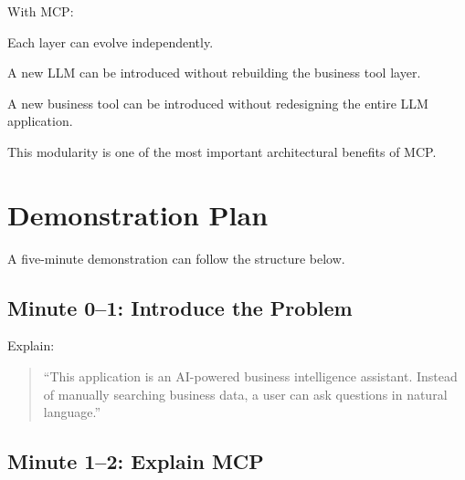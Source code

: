 \documentclass[11pt,a4paper]{article}
\begin{document}
With MCP:

\begin{center}


\end{center}

Each layer can evolve independently.

A new LLM can be introduced without rebuilding the business tool layer.

A new business tool can be introduced without redesigning the entire
LLM application.

This modularity is one of the most important architectural benefits
of MCP.

\section{Demonstration Plan}

A five-minute demonstration can follow the structure below.

\subsection{Minute 0--1: Introduce the Problem}

Explain:

\begin{quote}
``This application is an AI-powered business intelligence assistant.
Instead of manually searching business data, a user can ask questions
in natural language.''
\end{quote}

\subsection{Minute 1--2: Explain MCP}
\end{document}
